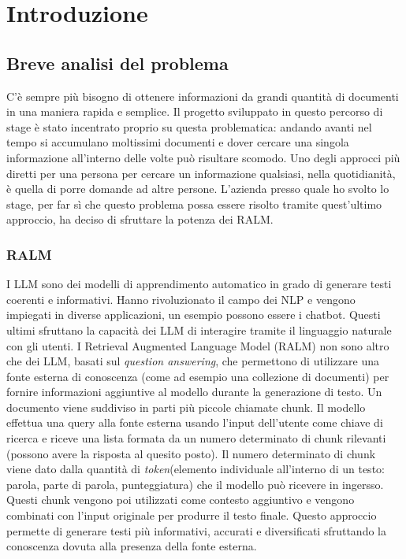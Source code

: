 \chapter{Introduzione}
\label{cap:introduzione}


\section{Breve analisi del problema}
C'è sempre più bisogno di ottenere informazioni da grandi quantità di documenti in una maniera rapida e semplice.
Il progetto sviluppato in questo percorso di stage è stato incentrato proprio su questa problematica: andando avanti nel tempo si accumulano moltissimi documenti e dover cercare una singola informazione all'interno delle volte può risultare scomodo.
Uno degli approcci più diretti per una persona per cercare un informazione qualsiasi, nella quotidianità, è quella di porre domande ad altre persone.
L'azienda presso quale ho svolto lo stage, per far sì che questo problema possa essere risolto tramite quest'ultimo approccio, ha deciso di sfruttare la potenza dei RALM. \\

\subsection{RALM}
I \gls{LLM} sono dei modelli di apprendimento automatico in grado di generare testi coerenti e informativi.
Hanno rivoluzionato il campo dei \gls{NLP} e vengono impiegati in diverse applicazioni, un esempio possono essere i chatbot.
Questi ultimi sfruttano la capacità dei LLM di interagire tramite il linguaggio naturale con gli utenti.
I Retrieval Augmented Language Model (RALM) non sono altro che dei LLM, basati sul \emph{\gls{question answering}}\glsfirstoccur, che permettono di utilizzare una fonte esterna di conoscenza (come ad esempio una collezione di documenti)
per fornire informazioni aggiuntive al modello durante la generazione di testo.
\noindent Un documento viene suddiviso in parti più piccole chiamate chunk. 
Il modello effettua una query alla fonte esterna usando l'input dell'utente come chiave di ricerca e riceve una lista formata da un numero determinato di chunk rilevanti (possono avere la risposta al quesito posto).
Il numero determinato di chunk viene dato dalla quantità di \emph{\gls{token}}\glsfirstoccur (elemento individuale all'interno di un testo: parola, parte di parola, punteggiatura) che il modello può ricevere in ingersso.
Questi chunk vengono poi utilizzati come contesto aggiuntivo e vengono combinati con l'input originale per produrre il testo finale.
Questo approccio permette di generare testi più informativi, accurati e diversificati sfruttando la conoscenza dovuta alla presenza della fonte esterna.

